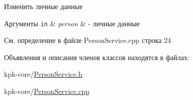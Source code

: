 Изменить личные данные 


\begin{DoxyParams}[1]{Аргументы}
\mbox{\tt in}  & {\em person} & -\/ личные данные \\
\hline
\end{DoxyParams}


См. определение в файле Person\+Service.\+cpp строка 24



Объявления и описания членов классов находятся в файлах\+:\begin{DoxyCompactItemize}
\item 
kpk-\/core/\hyperlink{_person_service_8h}{Person\+Service.\+h}\item 
kpk-\/core/\hyperlink{_person_service_8cpp}{Person\+Service.\+cpp}\end{DoxyCompactItemize}
